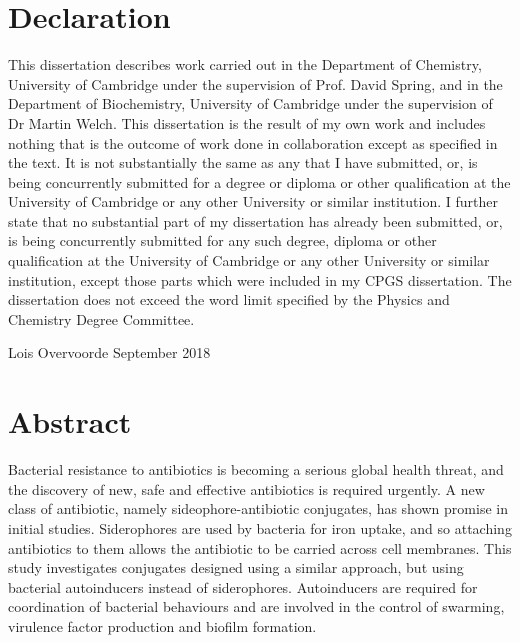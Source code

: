 \newpage

\section{Declaration}

This dissertation describes work carried out in the Department of Chemistry, University of Cambridge under the supervision of Prof. David Spring, and in the Department of Biochemistry, University of Cambridge under the supervision of Dr Martin Welch. 
This dissertation is the result of my own work and includes nothing that is the outcome of work done in collaboration except as specified in the text. 
It is not substantially the same as any that I have submitted, or, is being concurrently submitted for a degree or diploma or other qualification at the University of Cambridge or any other University or similar institution. 
I further state that no substantial part of my dissertation has already been submitted, or, is being concurrently submitted for any such degree, diploma or other qualification at the University of Cambridge or any other University or similar institution, except those parts which were included in my CPGS dissertation.
The dissertation does not exceed the word limit specified by the Physics and Chemistry Degree Committee.








\vspace{5cm}



Lois Overvoorde
September 2018

\newpage

\section{Abstract}

Bacterial resistance to antibiotics is becoming a serious global health threat, and the discovery of new, safe and effective antibiotics is required urgently\cite{ResistanceUS,davies2013drugs,ANIE:ANIE201209979}. A new class of antibiotic, namely sideophore-antibiotic conjugates, has shown promise in initial studies\cite{Page2013,Schalk2017}. Siderophores are used by bacteria for iron uptake, and so attaching antibiotics to them allows the antibiotic to be carried across cell membranes. This study investigates conjugates designed using a similar approach, but using bacterial autoinducers\cite{Waters2005} instead of siderophores. Autoinducers are required for coordination of bacterial behaviours and are involved in the control of swarming, virulence factor production and biofilm formation\cite{Miller2001}. 


